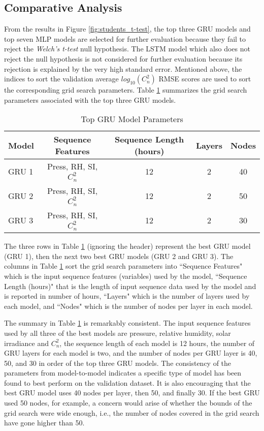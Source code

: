 \subsection{Comparative Analysis}
From the results in Figure \ref{fig:students_t-test}, the top three GRU models and top seven MLP models are selected for further evaluation because they fail to reject the \textit{Welch's t-test} null hypothesis. The LSTM model which also does not reject the null hypothesis is not considered for further evaluation because its rejection is explained by the very high standard error. Mentioned above, the indices to sort the validation average $log_{10}(C_{n}^{2})$ RMSE scores are used to sort the corresponding grid search parameters. Table \ref{tab:grid_search_results_GRU} summarizes the grid search parameters associated with the top three GRU models.
\begin{table}[h!]
	\begin{center}
		\caption{Top GRU Model Parameters}
		\label{tab:grid_search_results_GRU}
		\begin{tabular}{||l|c|c|c|c||}
			\hline
			Model & Sequence Features & Sequence Length (hours) & Layers & Nodes \\
			\hline
			\hline
			GRU 1 & Press, RH, SI, $C_{n}^{2}$ & 12 & 2 & 40 \\
			\hline
			GRU 2 & Press, RH, SI, $C_{n}^{2}$ & 12 & 2 & 50 \\
			\hline
			GRU 3 & Press, RH, SI, $C_{n}^{2}$ & 12 & 2 & 30 \\
			\hline
		\end{tabular}
	\end{center}
\end{table}
The three rows in Table \ref{tab:grid_search_results_GRU} (ignoring the header) represent the best GRU model (GRU 1), then the next two best GRU models (GRU 2 and GRU 3). The columns in Table \ref{tab:grid_search_results_GRU} sort the grid search parameters into ``Sequence Features" which is the input sequence features (variables) used by the model, ``Sequence Length (hours)" that is the length of input sequence data used by the model and is reported in number of hours, ``Layers" which is the number of layers used by each model, and ``Nodes" which is the number of nodes per layer in each model.

The summary in Table \ref{tab:grid_search_results_GRU} is remarkably consistent. The input sequence features used by all three of the best models are pressure, relative humidity, solar irradiance and $C_{n}^{2}$, the sequence length of each model is 12 hours, the number of GRU layers for each model is two, and the number of nodes per GRU layer is 40, 50, and 30 in order of the top three GRU models. The consistency of the parameters from model-to-model indicates a specific type of model has been found to best perform on the validation dataset. It is also encouraging that the best GRU model uses 40 nodes per layer, then 50, and finally 30. If the best GRU used 50 nodes, for example, a concern would arise of whether the bounds of the grid search were wide enough, i.e., the number of nodes covered in the grid search have gone higher than 50.

